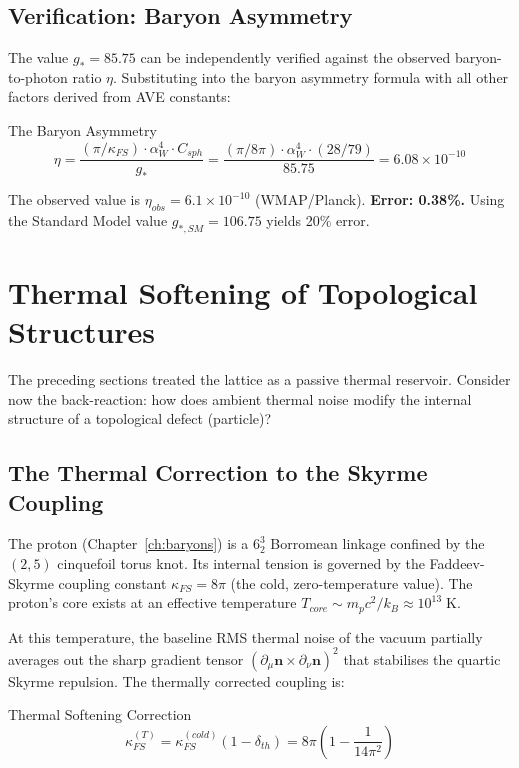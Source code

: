 \subsection{Verification: Baryon Asymmetry}

The value $g_* = 85.75$ can be independently verified against the observed baryon-to-photon ratio $\eta$. Substituting into the baryon asymmetry formula with all other factors derived from AVE constants:
\begin{resultbox}{The Baryon Asymmetry}
\begin{equation}
    \eta = \frac{(\pi / \kappa_{FS}) \cdot \alpha_W^4 \cdot C_{sph}}{g_*} = \frac{(\pi / 8\pi) \cdot \alpha_W^4 \cdot (28/79)}{85.75} = 6.08 \times 10^{-10}
    \label{eq:baryon_asymmetry}
\end{equation}
\end{resultbox}
The observed value is $\eta_{obs} = 6.1 \times 10^{-10}$ (WMAP/Planck). \textbf{Error: 0.38\%.} Using the Standard Model value $g_{*,SM} = 106.75$ yields 20\% error.

\section{Thermal Softening of Topological Structures}
\label{sec:thermal_softening_thermo}

The preceding sections treated the lattice as a passive thermal reservoir. Consider now the back-reaction: how does ambient thermal noise modify the internal structure of a topological defect (particle)?

\subsection{The Thermal Correction to the Skyrme Coupling}

The proton (Chapter~\ref{ch:baryons}) is a $6_2^3$ Borromean linkage confined by the $(2,5)$ cinquefoil torus knot. Its internal tension is governed by the Faddeev-Skyrme coupling constant $\kappa_{FS} = 8\pi$ (the cold, zero-temperature value). The proton's core exists at an effective temperature $T_{core} \sim m_p c^2 / k_B \approx 10^{13}\;\text{K}$.

At this temperature, the baseline RMS thermal noise of the vacuum partially averages out the sharp gradient tensor $(\partial_\mu \mathbf{n} \times \partial_\nu \mathbf{n})^2$ that stabilises the quartic Skyrme repulsion. The thermally corrected coupling is:
\begin{resultbox}{Thermal Softening Correction}
\begin{equation}
    \kappa_{FS}^{(T)} = \kappa_{FS}^{(cold)} (1 - \delta_{th}) = 8\pi \left(1 - \frac{1}{14\pi^2}\right)
    \label{eq:thermal_kappa}
\end{equation}
\end{resultbox}

